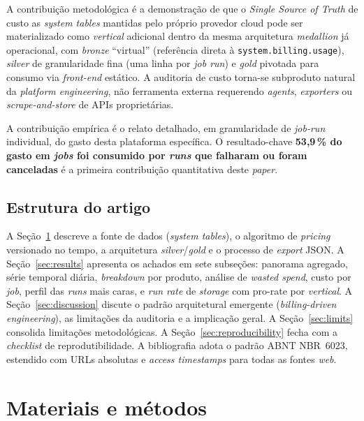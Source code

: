\documentclass[12pt,a4paper,oneside]{article}
\begin{document}
A contribuição metodológica é a demonstração de que o
\textit{Single Source of Truth} de custo \textemdash{} as
\textit{system tables} mantidas pelo próprio provedor cloud
\textemdash{} pode ser materializado como \textit{vertical}
adicional dentro da mesma arquitetura \textit{medallion} já
operacional, com \textit{bronze} ``virtual'' (referência direta à
\texttt{system.billing.usage}), \textit{silver} de granularidade
fina (uma linha por \textit{job run}) e \textit{gold} pivotada para
consumo via \textit{front-end} estático. A auditoria de custo
torna-se subproduto natural da \textit{platform engineering},
não ferramenta externa requerendo \textit{agents},
\textit{exporters} ou \textit{scrape-and-store} de APIs proprietárias.

A contribuição empírica é o relato detalhado, em granularidade de
\textit{job-run} individual, do gasto desta plataforma específica.
O resultado-chave \textemdash{} \textbf{53,9\,\% do gasto em
\textit{jobs} foi consumido por \textit{runs} que falharam ou foram
canceladas} \textemdash{} é a primeira contribuição quantitativa
deste \textit{paper}.

\subsection*{Estrutura do artigo}

A Seção~\ref{sec:methods} descreve a fonte de dados (\textit{system
tables}), o algoritmo de \textit{pricing} versionado no tempo, a
arquitetura \textit{silver}/\textit{gold} e o processo de
\textit{export} JSON. A Seção~\ref{sec:results} apresenta os
achados em sete subseções: panorama agregado, série temporal
diária, \textit{breakdown} por produto, análise de
\textit{wasted spend}, custo por \textit{job}, perfil das
\textit{runs} mais caras, e \textit{run rate} de \textit{storage}
com pro-rate por \textit{vertical}. A Seção~\ref{sec:discussion}
discute o padrão arquitetural emergente
(\textit{billing-driven engineering}), as limitações da auditoria
e a implicação geral. A Seção~\ref{sec:limits} consolida limitações
metodológicas. A Seção~\ref{sec:reproducibility} fecha com a
\textit{checklist} de reprodutibilidade. A bibliografia adota o
padrão ABNT NBR~6023, estendido com URLs absolutas e \textit{access
timestamps} para todas as fontes \textit{web}.

\section{Materiais e métodos}\label{sec:methods}
\end{document}
